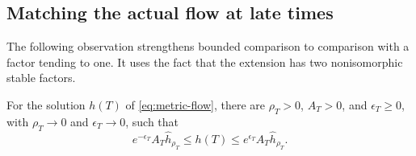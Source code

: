 \subsection{Matching the actual flow at late times}

The following observation strengthens bounded comparison to comparison
with a factor tending to one. It uses the fact that the extension has
two nonisomorphic stable factors.

\begin{lemma}\label{lem:flow-matching}
For the solution $h(T)$ of \eqref{eq:metric-flow}, there are
$\rho_T>0$, $A_T>0$, and $\epsilon_T\ge0$, with
$\rho_T\to0$ and $\epsilon_T\to0$, such that
\begin{equation}\label{eq:flow-matching}
 e^{-\epsilon_T}A_T\widehat h_{\rho_T}
 \le h(T)\le e^{\epsilon_T}A_T\widehat h_{\rho_T}.
\end{equation}
\end{lemma}

